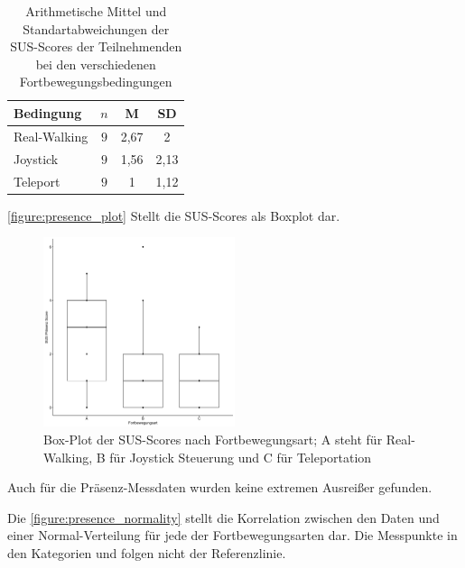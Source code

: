                     \begin{table}[!h]
                        \renewcommand\arraystretch{1.2}
                        \centering
                        \begin{tabular}{lccc} \toprule
                            Bedingung       & $n$ & M       & SD     \\ \midrule
                            Real-Walking    & $9$ & 2,67 & 2  \\
                            Joystick        & $9$ & 1,56 & 2,13  \\
                            Teleport        & $9$ & 1    & 1,12 \\ \bottomrule
                        \end{tabular}
                        \caption{Arithmetische Mittel und Standartabweichungen der SUS-Scores der Teilnehmenden bei den verschiedenen Fortbewegungsbedingungen} \label{table:presence_means}
                    \end{table}

                    \autoref{figure:presence_plot} Stellt die SUS-Scores als Boxplot dar.

                    \begin{figure}[!h]
                        \centering
                        \includegraphics[width=0.5\textwidth]{plots/presence_plot.png}
                        \caption{Box-Plot der SUS-Scores nach Fortbewegungsart; A steht für Real-Walking, B für Joystick Steuerung und C für Teleportation}\label{figure:presence_plot}
                    \end{figure}

                    Auch für die Präsenz-Messdaten wurden keine extremen Ausreißer gefunden.

                    Die \autoref{figure:presence_normality} stellt die Korrelation zwischen den Daten und einer Normal-Verteilung für jede der Fortbewegungsarten dar.
                    Die Messpunkte in den Kategorien  und  folgen nicht der Referenzlinie.

